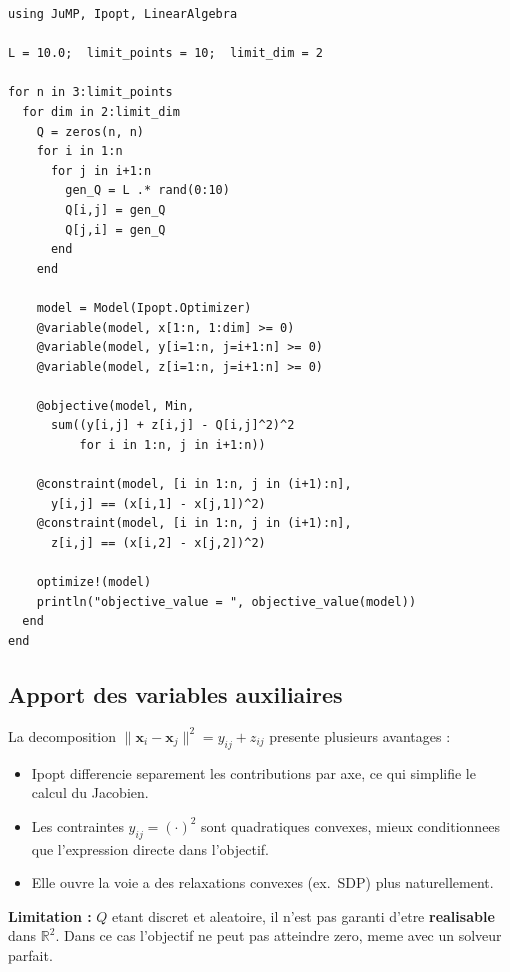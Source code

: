 \documentclass[12pt,a4paper]{article}
\begin{document}
\begin{lstlisting}[caption={formulation\_2\_v1.jl}]
using JuMP, Ipopt, LinearAlgebra

L = 10.0;  limit_points = 10;  limit_dim = 2

for n in 3:limit_points
  for dim in 2:limit_dim
    Q = zeros(n, n)
    for i in 1:n
      for j in i+1:n
        gen_Q = L .* rand(0:10)
        Q[i,j] = gen_Q
        Q[j,i] = gen_Q
      end
    end

    model = Model(Ipopt.Optimizer)
    @variable(model, x[1:n, 1:dim] >= 0)
    @variable(model, y[i=1:n, j=i+1:n] >= 0)
    @variable(model, z[i=1:n, j=i+1:n] >= 0)

    @objective(model, Min,
      sum((y[i,j] + z[i,j] - Q[i,j]^2)^2
          for i in 1:n, j in i+1:n))

    @constraint(model, [i in 1:n, j in (i+1):n],
      y[i,j] == (x[i,1] - x[j,1])^2)
    @constraint(model, [i in 1:n, j in (i+1):n],
      z[i,j] == (x[i,2] - x[j,2])^2)

    optimize!(model)
    println("objective_value = ", objective_value(model))
  end
end
\end{lstlisting}

\subsection{Apport des variables auxiliaires}

La decomposition $\|\mathbf{x}_i-\mathbf{x}_j\|^2 = y_{ij}+z_{ij}$
presente plusieurs avantages :

\begin{itemize}
  \item Ipopt differencie separement les contributions par axe,
        ce qui simplifie le calcul du Jacobien.
  \item Les contraintes $y_{ij}=(\cdot)^2$ sont quadratiques convexes,
        mieux conditionnees que l'expression directe dans l'objectif.
  \item Elle ouvre la voie a des relaxations convexes (ex.\ SDP)
        plus naturellement.
\end{itemize}

\begin{remarquebox}
\textbf{Limitation :} $Q$ etant discret et aleatoire, il n'est pas
garanti d'etre \textbf{realisable} dans $\mathbb{R}^2$.  Dans ce cas
l'objectif ne peut pas atteindre zero, meme avec un solveur parfait.
\end{remarquebox}
\end{document}
